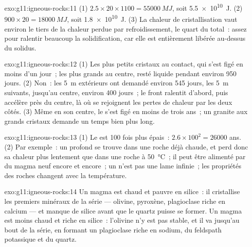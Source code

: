 \begin{solution}{exo:g11:igneous-rocks:11}
(1) $2.5 \times 20 \times 1100 = \qty{55000}{MJ}$, soit \qty{5.5e10}{J}.
(2) $900 \times 20 = \qty{18000}{MJ}$, soit \qty{1.8e10}{J}. (3) La chaleur
de cristallisation vaut environ le tiers de la chaleur perdue par
refroidissement, le quart du total~: assez pour ralentir beaucoup la
solidification, car elle est entièrement libérée au-dessus du solidus.
\end{solution}

\begin{solution}{exo:g11:igneous-rocks:12}
(1) Les plus petits cristaux au contact, qui s'est figé en moins d'un
jour~; les plus grands au centre, resté liquide pendant environ 950 jours.
(2) Non~: les \qty{5}{m} extérieurs ont demandé environ 545 jours, les
\qty{5}{m} suivants, jusqu'au centre, environ 400 jours~; le front
ralentit d'abord, puis accélère près du centre, là où se rejoignent les
pertes de chaleur par les deux côtés. (3) Même en son centre, le 
s'est figé en moins de trois ans~; un granite aux grands cristaux demande
un temps bien plus long.
\end{solution}

\begin{solution}{exo:g11:igneous-rocks:13}
(1) Le  est 100 fois plus épais~: $2.6 \times 100^2 = \num{26000}$
ans. (2) Par exemple~: un  profond se trouve dans une roche déjà
chaude, et perd donc sa chaleur plus lentement que dans une roche à
\qty{50}{\degreeCelsius}~; il peut être alimenté par du magma neuf encore
et encore~; un  n'est pas une lame infinie~; les propriétés des
roches changent avec la température.
\end{solution}

\begin{solution}{exo:g11:igneous-rocks:14}
Un magma  est chaud et pauvre en silice~: il cristallise les
premiers minéraux de la série --- olivine, pyroxène, plagioclase riche en
calcium --- et manque de silice avant que le quartz puisse se former. Un
magma  est moins chaud et riche en silice~: l'olivine n'y est pas
stable, et il va jusqu'au bout de la série, en formant un plagioclase riche
en sodium, du feldspath potassique et du quartz.
\end{solution}

